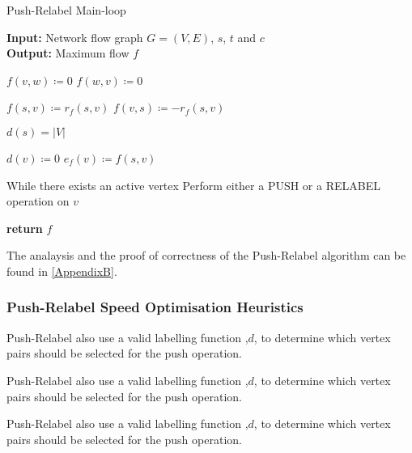 \begin{algorithm}
	\caption{Push-Relabel Main-loop}\label{alg:main_no_optimisation}
	\textbf{Input:} Network flow graph $G=(V,E)$, $s$, $t$ and $c$\\
	\textbf{Output:} Maximum flow $f$
	\begin{algorithmic}[1]
		\State $f(v,w) \coloneqq 0$
		\State $f(w,v) \coloneqq 0$
		\EndFor
		\item[]
		\State $f(s,v) \coloneqq r_f(s,v)$
		\State $f(v,s) \coloneqq -r_f(s,v)$
		\EndFor
		\item[]
		\State $d(s) = |V|$
		\item[]
		\State $d(v) \coloneqq 0$
		\State $e_f(v) \coloneqq f(s,v)$
		\EndFor
		\item[]
		\State While there exists an active vertex
		 
		\State Perform either a PUSH or a RELABEL operation on $v$
		\EndWhile
		\item[]
		\State \textbf{return} $f$
		\EndProcedure
	\end{algorithmic}
\end{algorithm}

The analaysis and the proof of correctness of the Push-Relabel algorithm can be found in \autoref{AppendixB}.


\subsubsection{Push-Relabel Speed Optimisation Heuristics}
\begin{definition}[Discharge]
	Push-Relabel also use a valid labelling function ,$d$, to determine which vertex pairs should be selected for the push operation.
\end{definition}

\begin{definition}[FIFO]
	Push-Relabel also use a valid labelling function ,$d$, to determine which vertex pairs should be selected for the push operation.
\end{definition}

\begin{definition}
	Push-Relabel also use a valid labelling function ,$d$, to determine which vertex pairs should be selected for the push operation.
\end{definition}

